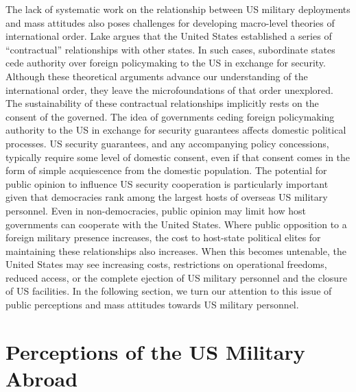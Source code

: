 The lack of systematic work on the relationship between US military deployments and mass attitudes also poses challenges for developing macro-level theories of international order. Lake argues that the United States established a series of ``contractual'' relationships with other states.\autocite{Lake2013} In such cases, subordinate states cede authority over foreign policymaking to the US in exchange for security. Although these theoretical arguments advance our understanding of the international order, they leave the microfoundations of that order unexplored. The sustainability of these contractual relationships implicitly rests on the consent of the governed. The idea of governments ceding foreign policymaking authority to the US in exchange for security guarantees affects domestic political processes. US security guarantees, and any accompanying policy concessions, typically require some level of domestic consent, even if that consent comes in the form of simple acquiescence from the domestic population. The potential for public opinion to influence US security cooperation is particularly important given that democracies rank among the largest hosts of overseas US military personnel. Even in non-democracies, public opinion may limit how host governments can cooperate with the United States. Where public opposition to a foreign military presence increases, the cost to host-state political elites for maintaining these relationships also increases. When this becomes untenable, the United States may see increasing costs, restrictions on operational freedoms, reduced access, or the complete ejection of US military personnel and the closure of US facilities. In the following section, we turn our attention to this issue of public perceptions and mass attitudes towards US military personnel.

\section*{Perceptions of the US Military Abroad}

